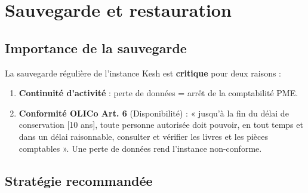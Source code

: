 \documentclass[a4paper,11pt,oneside]{article}
\begin{document}
\section{Sauvegarde et restauration}

\subsection{Importance de la sauvegarde}

La sauvegarde régulière de l'instance Kesh est \textbf{critique} pour deux raisons :

\begin{enumerate}
    \item \textbf{Continuité d'activité} : perte de données = arrêt de la comptabilité PME.
    \item \textbf{Conformité OLICo Art. 6} (Disponibilité) : « jusqu'à la fin du délai de conservation [10 ans], toute personne autorisée doit pouvoir, en tout temps et dans un délai raisonnable, consulter et vérifier les livres et les pièces comptables ». Une perte de données rend l'instance non-conforme.
\end{enumerate}

\subsection{Stratégie recommandée}
\end{document}
